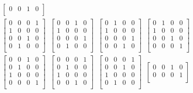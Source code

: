 \documentclass[]{article}
\begin{document}
\begin{equation}
\begin{aligned}
\begin{bmatrix}
0 &0 &1 &0\\
 \end{bmatrix}\;\;\\\begin{bmatrix}
0 &0 &0 &1\\
1 &0 &0 &0\\
0 &0 &1 &0\\
0 &1 &0 &0\\
 \end{bmatrix}\;\;\begin{bmatrix}
0 &0 &1 &0\\
1 &0 &0 &0\\
0 &0 &0 &1\\
0 &1 &0 &0\\
 \end{bmatrix}\;\;\begin{bmatrix}
0 &1 &0 &0\\
1 &0 &0 &0\\
0 &0 &0 &1\\
0 &0 &1 &0\\
 \end{bmatrix}\;\;\begin{bmatrix}
0 &1 &0 &0\\
1 &0 &0 &0\\
0 &0 &1 &0\\
0 &0 &0 &1\\
 \end{bmatrix}\;\;\\\begin{bmatrix}
0 &0 &1 &0\\
0 &1 &0 &0\\
1 &0 &0 &0\\
0 &0 &0 &1\\
 \end{bmatrix}\;\;\begin{bmatrix}
0 &0 &0 &1\\
0 &1 &0 &0\\
1 &0 &0 &0\\
0 &0 &1 &0\\
 \end{bmatrix}\;\;\begin{bmatrix}
0 &0 &0 &1\\
0 &0 &1 &0\\
1 &0 &0 &0\\
0 &1 &0 &0\\
 \end{bmatrix}\;\;\begin{bmatrix}
0 &0 &1 &0\\
0 &0 &0 &1\\

\end{bmatrix}
\end{aligned}
\end{equation}
\end{document}
